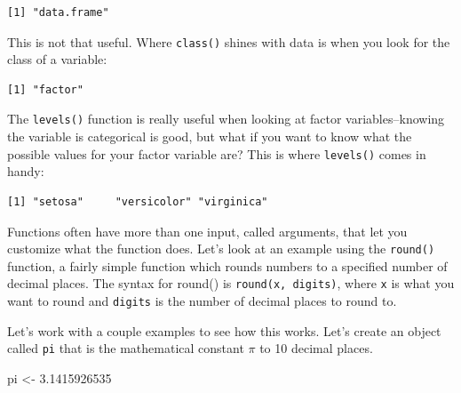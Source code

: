 \documentclass[
  letterpaper,
]{book}
\newenvironment{Shaded}{\begin{snugshade}}{\end{snugshade}}
\newcommand{\FloatTok}[1]{\textcolor[rgb]{0.68,0.00,0.00}{#1}}
\newcommand{\FunctionTok}[1]{\textcolor[rgb]{0.28,0.35,0.67}{#1}}
\newcommand{\NormalTok}[1]{\textcolor[rgb]{0.00,0.23,0.31}{#1}}
\newcommand{\OtherTok}[1]{\textcolor[rgb]{0.00,0.23,0.31}{#1}}
\newcommand{\SpecialCharTok}[1]{\textcolor[rgb]{0.37,0.37,0.37}{#1}}
\begin{document}
\begin{verbatim}
[1] "data.frame"
\end{verbatim}

This is not that useful. Where \texttt{class()} shines with data is when
you look for the class of a variable:

\begin{Shaded}
\end{Shaded}

\begin{verbatim}
[1] "factor"
\end{verbatim}

The \texttt{levels()} function is really useful when looking at factor
variables--knowing the variable is categorical is good, but what if you
want to know what the possible values for your factor variable are? This
is where \texttt{levels()} comes in handy:

\begin{Shaded}
\end{Shaded}

\begin{verbatim}
[1] "setosa"     "versicolor" "virginica" 
\end{verbatim}

Functions often have more than one input, called arguments, that let you
customize what the function does. Let's look at an example using the
\texttt{round()} function, a fairly simple function which rounds numbers
to a specified number of decimal places. The syntax for round() is
\texttt{round(x,\ digits)}, where \texttt{x} is what you want to round
and \texttt{digits} is the number of decimal places to round to.

Let's work with a couple examples to see how this works. Let's create an
object called \texttt{pi} that is the mathematical constant \(\pi\) to
10 decimal places.

\begin{Shaded}
\begin{Highlighting}[]
\NormalTok{pi }\OtherTok{\textless{}{-}} \FloatTok{3.1415926535}
\end{Highlighting}
\end{Shaded}
\end{document}
